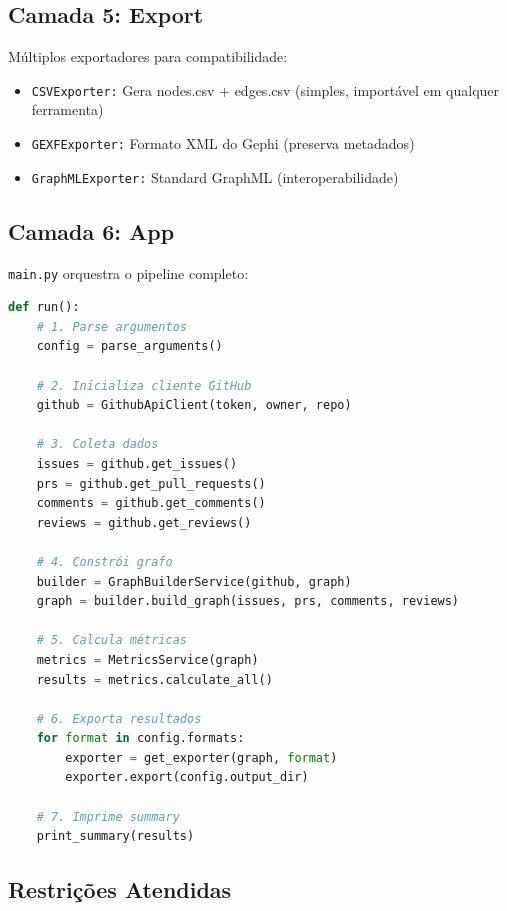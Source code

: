 \documentclass[12pt,a4paper]{article}
\begin{document}
\subsection{Camada 5: Export}

Múltiplos exportadores para compatibilidade:

\begin{itemize}
  \item \texttt{CSVExporter:} Gera nodes.csv + edges.csv (simples, importável em qualquer ferramenta)
  \item \texttt{GEXFExporter:} Formato XML do Gephi (preserva metadados)
  \item \texttt{GraphMLExporter:} Standard GraphML (interoperabilidade)
\end{itemize}

\subsection{Camada 6: App}

\texttt{main.py} orquestra o pipeline completo:

\begin{lstlisting}[language=Python, caption=Fluxo principal simplificado]
def run():
    # 1. Parse argumentos
    config = parse_arguments()

    # 2. Inicializa cliente GitHub
    github = GithubApiClient(token, owner, repo)

    # 3. Coleta dados
    issues = github.get_issues()
    prs = github.get_pull_requests()
    comments = github.get_comments()
    reviews = github.get_reviews()

    # 4. Constrói grafo
    builder = GraphBuilderService(github, graph)
    graph = builder.build_graph(issues, prs, comments, reviews)

    # 5. Calcula métricas
    metrics = MetricsService(graph)
    results = metrics.calculate_all()

    # 6. Exporta resultados
    for format in config.formats:
        exporter = get_exporter(graph, format)
        exporter.export(config.output_dir)

    # 7. Imprime summary
    print_summary(results)
\end{lstlisting}

\subsection{Restrições Atendidas}
\end{document}
